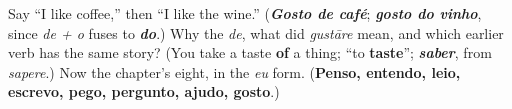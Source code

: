 \begin{tcolorbox}[breakable,colback=teal!4,colframe=teal!35!black,title={Before you move on}]
Say \textquotedblleft{}I like coffee,\textquotedblright{} then \textquotedblleft{}I like the wine.\textquotedblright{} (\emph{\textbf{Gosto de café}}; \emph{\textbf{gosto do vinho}}, since \emph{de + o} fuses to \emph{\textbf{do}}.) Why the \emph{de}, what did \emph{gustāre} mean, and which earlier verb has the same story? (You take a taste \textbf{of} a thing; \textquotedblleft{}to \textbf{taste}\textquotedblright{}; \emph{\textbf{saber}}, from \emph{sapere}.) Now the chapter's eight, in the \emph{eu} form. (\textbf{Penso, entendo, leio, escrevo, pego, pergunto, ajudo, gosto}.)
\end{tcolorbox}
